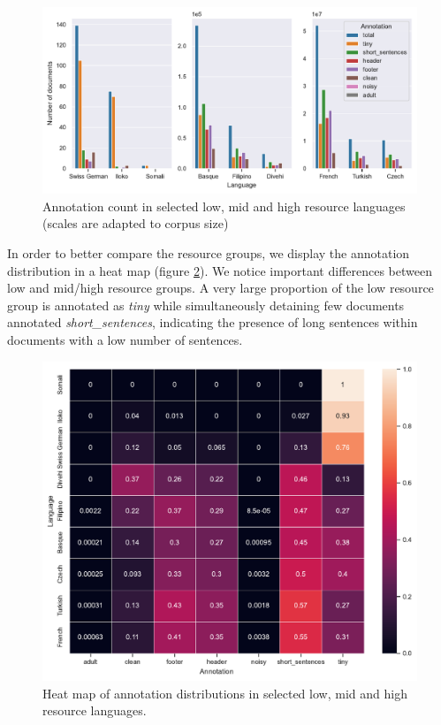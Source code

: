\begin{figure}[!ht]
    \begin{center}
        \includegraphics[scale=0.7]{static/media/oscar/towards/annot_count.pdf}
        \caption{Annotation count in selected low, mid and high resource languages (scales are adapted to corpus size)}
        \label{annot-count}
    \end{center}
\end{figure}

In order to better compare the resource groups, we display the annotation distribution in a heat map (figure \ref{annot-heatmap}).
We notice important differences between low and mid/high resource groups.
A very large proportion of the low resource group is annotated as \textit{tiny} while simultaneously detaining few documents annotated \textit{short\_sentences}, indicating the presence of long sentences within documents with a low number of sentences.

\begin{figure}[!ht]
    \begin{center}
        \includegraphics[width=\linewidth]{static/media/oscar/towards/annot_heatmap}
        \caption{Heat map of annotation distributions in selected low, mid and high resource languages.}
        \label{annot-heatmap}
    \end{center}
\end{figure}

